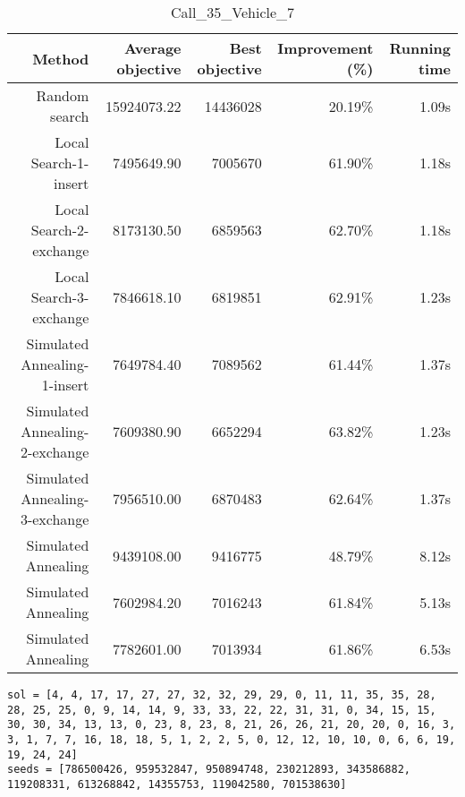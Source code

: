\begin{table}[ht]
\centering
\caption{Call\_35\_Vehicle\_7}
\label{tab:call35vehicle7}
\begin{tabular}{|r|r|r|r|r|}
Method & Average objective & Best objective & Improvement (\%) & Running time \\
\hline
Random search & 15924073.22 & 14436028 & 20.19\% & 1.09s\\
Local Search-1-insert & 7495649.90 & 7005670 & 61.90\% & 1.18s\\
Local Search-2-exchange & 8173130.50 & 6859563 & 62.70\% & 1.18s\\
Local Search-3-exchange & 7846618.10 & 6819851 & 62.91\% & 1.23s\\
Simulated Annealing-1-insert & 7649784.40 & 7089562 & 61.44\% & 1.37s\\
Simulated Annealing-2-exchange & 7609380.90 & 6652294 & 63.82\% & 1.23s\\
Simulated Annealing-3-exchange & 7956510.00 & 6870483 & 62.64\% & 1.37s\\
Simulated Annealing & 9439108.00 & 9416775 & 48.79\% & 8.12s\\
Simulated Annealing & 7602984.20 & 7016243 & 61.84\% & 5.13s\\
Simulated Annealing & 7782601.00 & 7013934 & 61.86\% & 6.53s\\
\end{tabular}%
\end{table}
\begin{lstlisting}[label={lst:call35vehicle7},caption=Optimal solution call\_35\_vehicle\_7]
sol = [4, 4, 17, 17, 27, 27, 32, 32, 29, 29, 0, 11, 11, 35, 35, 28, 28, 25, 25, 0, 9, 14, 14, 9, 33, 33, 22, 22, 31, 31, 0, 34, 15, 15, 30, 30, 34, 13, 13, 0, 23, 8, 23, 8, 21, 26, 26, 21, 20, 20, 0, 16, 3, 3, 1, 7, 7, 16, 18, 18, 5, 1, 2, 2, 5, 0, 12, 12, 10, 10, 0, 6, 6, 19, 19, 24, 24]
seeds = [786500426, 959532847, 950894748, 230212893, 343586882, 119208331, 613268842, 14355753, 119042580, 701538630]
\end{lstlisting}%
\clearpage


